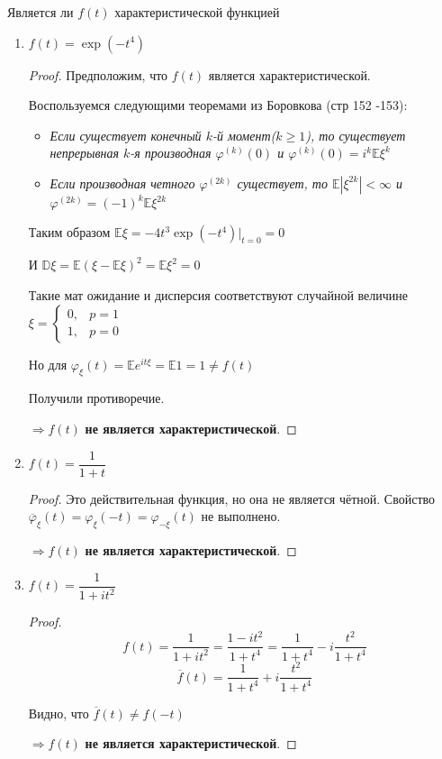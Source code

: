 \documentclass[a4paper,12pt]{article}
\newcommand{\dfr}{\dfrac}
\newcommand{\ol}{\overline}
\newcommand{\bb}{\mathbb}
\newcommand{\vp}{\varphi}
\begin{document}
Является ли $f(t)$ характеристической функцией
\begin{enumerate}
\item $f(t) = \exp(-t^4)$ 
\begin{proof}
Предположим, что $f(t)$ является характеристической.
	
Воспользуемся следующими теоремами из Боровкова (стр 152 -153):
\begin{itemize}
	\item \textit{Если существует конечный $k$-й момент($k \ge 1$), то существует непрерывная $k$-я производная $\vp^{(k)}(0)$ и $\vp^{(k)}(0) = i^k \bb E\xi^k$}
	\item \textit{Если производная четного $\vp^{(2k)}$ существует, то $\bb E |\xi^{2k}| < \infty$ и $\vp^{(2k)} = (-1)^k\bb E \xi^{2k} $} 
\end{itemize}
	
Таким образом $\bb E\xi = -4t^3\exp(-t^4)\Big|_{t = 0} = 0$

И $\bb D\xi = \bb E(\xi - \bb E\xi)^2 = \bb E\xi^2 = 0$

Такие мат ожидание и дисперсия соответствуют случайной величине 
$\xi = 
\begin{cases} 
0,& p = 1\\
1,& p = 0
\end{cases}$ 

Но для $\vp_{\xi}(t) = \bb Ee^{it\xi} = \bb E1 = 1 \neq f(t)$

Получили противоречие.

$\Rightarrow f(t)$ \textbf{не является характеристической}.
\end{proof}	
\item $f(t) = \dfr{1}{1+t}$
\begin{proof}
Это действительная функция, но она не является чётной. Свойство $\ol \varphi_{\xi}(t) = \varphi_{\xi}(-t) = \varphi_{-\xi}(t)$ не выполнено. 

$\Rightarrow f(t)$ \textbf{не является характеристической}.
\end{proof}
\item $f(t) = \dfr{1}{1+it^2}$
\begin{proof}
$$f(t) = \dfr{1}{1+it^2} = \dfr{1-it^2}{1+t^4} = \dfr{1}{1+t^4} - i\dfr{t^2}{1+t^4}$$
$$ \ol f(t) = \dfr{1}{1+t^4} + i\dfr{t^2}{1+t^4}$$

Видно, что  $\ol f(t) \neq f(-t)$

$\Rightarrow f(t)$ \textbf{не является характеристической}.
\end{proof}


\end{enumerate}
\end{document}
